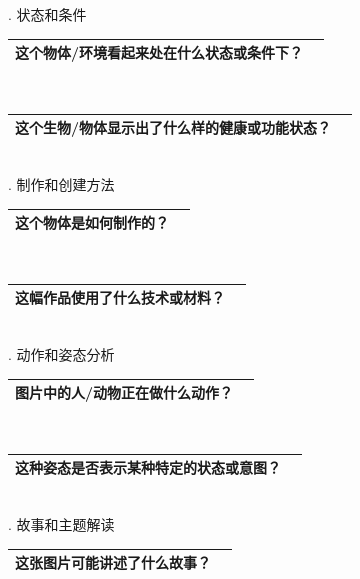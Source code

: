 \documentclass[12pt]{book}
\begin{document}
. 状态和条件

\begin{tabular}{|p{15cm}|p{3cm}|}
	\hline
这个物体/环境看起来处在什么状态或条件下？\\
	\hline
\end{tabular}\\



\begin{tabular}{|p{15cm}|p{3cm}|}
	\hline
这个生物/物体显示出了什么样的健康或功能状态？\\
	\hline
\end{tabular}\\



. 制作和创建方法

\begin{tabular}{|p{15cm}|p{3cm}|}
	\hline
这个物体是如何制作的？\\
	\hline
\end{tabular}\\



\begin{tabular}{|p{15cm}|p{3cm}|}
	\hline
这幅作品使用了什么技术或材料？\\
	\hline
\end{tabular}\\




. 动作和姿态分析

\begin{tabular}{|p{15cm}|p{3cm}|}
	\hline
图片中的人/动物正在做什么动作？\\
	\hline
\end{tabular}\\




\begin{tabular}{|p{15cm}|p{3cm}|}
	\hline
这种姿态是否表示某种特定的状态或意图？\\
	\hline
\end{tabular}\\


. 故事和主题解读

\begin{tabular}{|p{15cm}|p{3cm}|}
	\hline
这张图片可能讲述了什么故事？\\
	\hline
\end{tabular}\\
\end{document}
